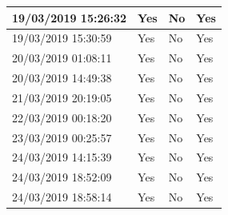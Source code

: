 \documentclass{l4proj}
\begin{document}
\begin{appendices}
\begin{table}[h!]
\begin{tabular}{|l|l|l|l|}
		19/03/2019 15:26:32 & Yes & No & Yes \\ \hline
		19/03/2019 15:30:59 & Yes & No & Yes \\ \hline
		20/03/2019 01:08:11 & Yes & No & Yes \\ \hline
		20/03/2019 14:49:38 & Yes & No & Yes \\ \hline
		21/03/2019 20:19:05 & Yes & No & Yes \\ \hline
		22/03/2019 00:18:20 & Yes & No & Yes \\ \hline
		23/03/2019 00:25:57 & Yes & No & Yes \\ \hline
		24/03/2019 14:15:39 & Yes & No & Yes \\ \hline
		24/03/2019 18:52:09 & Yes & No & Yes \\ \hline
		24/03/2019 18:58:14 & Yes & No & Yes \\ \hline
	\end{tabular}
\end{table}

\clearpage

\end{appendices}
\end{document}
